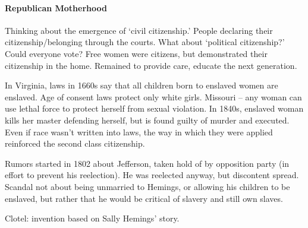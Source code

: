 \paragraph{Republican Motherhood} Thinking about the emergence of `civil citizenship.' People declaring their citizenship/belonging through the courts. What about `political citizenship?' Could everyone vote? Free women were citizens, but demonstrated their citizenship in the home. Remained to provide care, educate the next generation. 

In Virginia, laws in 1660s say that all children born to enslaved women are enslaved. Age of consent laws protect only white girls. Missouri -- any woman can use lethal force to protect herself from sexual violation. In 1840s, enslaved woman kills her master defending herself, but is found guilty of murder and executed. Even if race wasn't written into laws, the way in which they were applied reinforced the second class citizenship.

Rumors started in 1802 about Jefferson, taken hold of by opposition party (in effort to prevent his reelection). He was reelected anyway, but discontent spread. Scandal not about being unmarried to Hemings, or allowing his children to be enslaved, but rather that he would be critical of slavery and still own slaves.

Clotel: invention based on Sally Hemings' story.